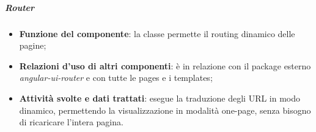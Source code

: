 \subparagraph{Router}
\begin{itemize}
	\item \textbf{Funzione del componente}: la classe permette il routing dinamico delle pagine;
	\item \textbf{Relazioni d’uso di altri componenti}: è in relazione con il package esterno \textit{angular-ui-router} e con tutte le pages e i templates;
	\item \textbf{Attività svolte e dati trattati}: esegue la traduzione degli URL in modo dinamico, permettendo la visualizzazione in modalità one-page, senza bisogno di ricaricare l'intera pagina.
\end{itemize}
